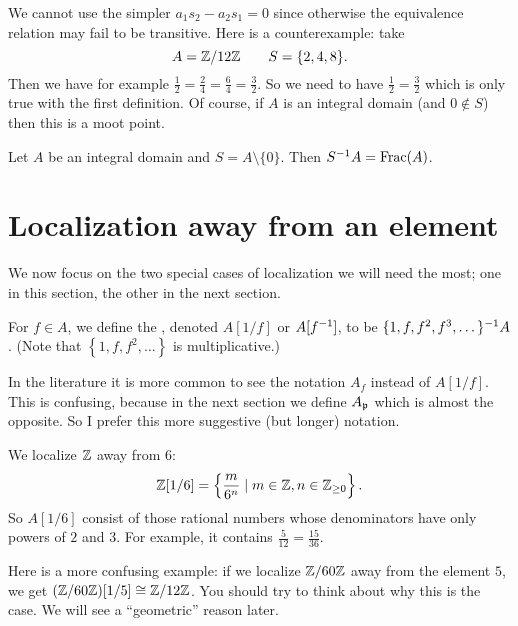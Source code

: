 \begin{remark}
	We cannot use the simpler $a_1s_2 - a_2s_1 = 0$ since
	otherwise the equivalence relation may fail to be transitive.
	Here is a counterexample: take
	\[ A = \mathbb Z/12\mathbb Z \qquad S = \{ 2, 4, 8 \}. \]
	Then we have for example $\frac12 = \frac24 = \frac64 = \frac32$.
	So we need to have $\frac12=\frac32$ which is only true
	with the first definition.
	Of course, if $A$ is an integral domain (and $0\notin S$)
	then this is a moot point.
\end{remark}

\begin{example}
	Let $A$ be an integral domain and $S = A \setminus \{0\}$.
	Then $S^{-1} A = \operatorname{Frac}(A)$.
\end{example}


\section{Localization away from an element}
We now focus on the two special cases of localization we will need the most;
one in this section, the other in the next section.
\begin{definition}
	For $f \in A$, we define the ,
	denoted $A[1/f]$ or $A[f^{-1}]$,
	to be $\{1, f, f^2, f^3, \dots\}^{-1} A$.
	(Note that $\left\{ 1, f, f^2, \dots \right\}$ is multiplicative.)
\end{definition}
\begin{remark}
	In the literature it is more common to
	see the notation $A_f$ instead of $A[1/f]$.
	This is confusing, because in the next section
	we define $A_\mathfrak p$ which is almost the opposite.
	So I prefer this more suggestive (but longer) notation.
\end{remark}

\begin{example}
	\listhack
	\begin{enumerate}[(a)]
		\ii We localize $\mathbb Z$ away from $6$:
		\[ \mathbb Z[1/6] = \left\{ \frac{m}{6^n} \mid m \in \mathbb Z,
			n \in \mathbb Z_{\ge 0} \right\}.  \]
		So $A[1/6]$ consist of those rational numbers whose
		denominators have only powers of $2$ and $3$.
		For example, it contains $\frac{5}{12} = \frac{15}{36}$.

		\ii Here is a more confusing example:
		if we localize $\mathbb Z/60\mathbb Z$ away from the element $5$,
		we get $(\mathbb Z/60\mathbb Z)[1/5] \cong \mathbb Z/12\mathbb Z$.
		You should try to think about why this is the case.
		We will see a ``geometric'' reason later.
	\end{enumerate}
\end{example}


